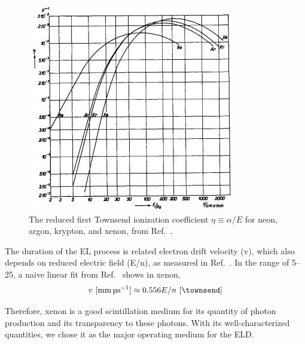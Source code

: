 \begin{figure}[!p]
	\centering
	\includegraphics[width=\figurewidth,clip,trim={0 0 0 0},angle=0,origin=c]{Figures/GasTest/XenonPhysicsUseful/FirstTownsendCoefficientKruithof1960.jpg}
	\caption[The reduced first Townsend ionization coefficient $\eta \equiv \alpha / E$ for neon, argon, krypton, and xenon.]{The reduced first Townsend ionization coefficient $\eta \equiv \alpha / E$ for neon, argon, krypton, and xenon, from Ref.~\cite{Kruithof1940}.}
	\label{fig:first Townsend}
\end{figure}

The duration of the EL process is related electron drift velocity (v), which also depends on reduced electric field (E/n), as measured in Ref.~\cite{English1953, Bowe1960, Pack1962, Brooks1982, Berghofer2004}. In the range of \SIrange{5}{25}{\townsend},  a naive linear fit from Ref.~\cite{Brooks1982} shows in xenon, 
\begin{align}
v\ [\si{\mm\per\us}] \approx 0.556 E/n\ [\si{\townsend}] \label{eqn:xenon electron drift velocity}
\end{align}


Therefore, xenon is a good scintillation medium for its quantity of photon production and its transparency to these photons. With its well-characterized quantities, we chose it as the major operating medium for the ELD.




